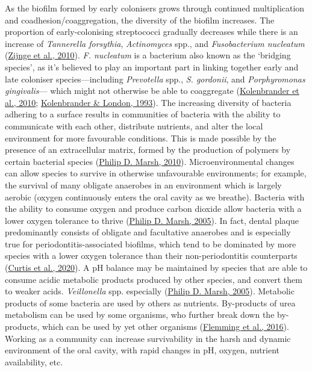 \documentclass[
  letterpaper,
]{book}
\begin{document}
As the biofilm formed by early colonisers grows through continued
multiplication and coadhesion/coaggregation, the diversity of the
biofilm increases. The proportion of early-colonising streptococci
gradually decreases while there is an increase of \emph{Tannerella
forsythia}, \emph{Actinomyces} spp., and \emph{Fusobacterium nucleatum}
(\protect\hyperlink{ref-zijngeBiofilmArchitecture2010}{Zijnge et al.,
2010}). \emph{F. nucleatum} is a bacterium also known as the `bridging
species', as it's believed to play an important part in linking together
early and late coloniser species---including \emph{Prevotella} spp.,
\emph{S. gordonii}, and \emph{Porphyromonas gingivalis}--- which might
not otherwise be able to coaggregate
(\protect\hyperlink{ref-kolenbranderOralMultispecies2010}{Kolenbrander
et al., 2010};
\protect\hyperlink{ref-kolenbranderAdhereToday1993}{Kolenbrander \&
London, 1993}). The increasing diversity of bacteria adhering to a
surface results in communities of bacteria with the ability to
communicate with each other, distribute nutrients, and alter the local
environment for more favourable conditions. This is made possible by the
presence of an extracellular matrix, formed by the production of
polymers by certain bacterial species
(\protect\hyperlink{ref-marshMicrobiologyDental2010}{Philip D. Marsh,
2010}). Microenvironmental changes can allow species to survive in
otherwise unfavourable environments; for example, the survival of many
obligate anaerobes in an environment which is largely aerobic (oxygen
continuously enters the oral cavity as we breathe). Bacteria with the
ability to consume oxygen and produce carbon dioxide allow bacteria with
a lower oxygen tolerance to thrive
(\protect\hyperlink{ref-marshDentalPlaque2005}{Philip D. Marsh, 2005}).
In fact, dental plaque predominantly consists of obligate and
facultative anaerobes and is especially true for
periodontitis-associated biofilms, which tend to be dominated by more
species with a lower oxygen tolerance than their non-periodontitis
counterparts (\protect\hyperlink{ref-curtisRoleMicrobiota2020}{Curtis et
al., 2020}). A pH balance may be maintained by species that are able to
consume acidic metabolic products produced by other species, and convert
them to weaker acids. \emph{Veillonella} spp. especially
(\protect\hyperlink{ref-marshDentalPlaque2005}{Philip D. Marsh, 2005}).
Metabolic products of some bacteria are used by others as nutrients.
By-products of urea metabolism can be used by some organisms, who
further break down the by-products, which can be used by yet other
organisms (\protect\hyperlink{ref-flemmingBiofilmsEmergent2016}{Flemming
et al., 2016}). Working as a community can increase survivability in the
harsh and dynamic environment of the oral cavity, with rapid changes in
pH, oxygen, nutrient availability, etc.
\end{document}

